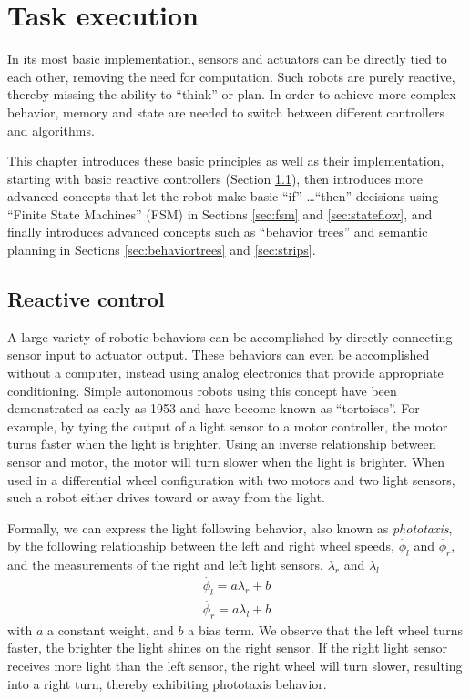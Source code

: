 \chapter{Task execution}\label{chap:taskexecution}
In its most basic implementation, sensors and actuators can be directly tied to each other, removing the need for computation. Such robots are purely reactive, thereby missing the ability to ``think'' or plan. In order to achieve more complex behavior, memory and state are needed to switch between different controllers and algorithms.

This chapter introduces these basic principles as well as their implementation, starting with basic reactive controllers (Section \ref{sec:braitenberg}), then introduces more advanced concepts that let the robot make basic ``if'' \ldots ``then'' decisions using ``Finite State Machines'' (FSM) in Sections \ref{sec:fsm} and \ref{sec:stateflow}, and finally introduces advanced concepts such as ``behavior trees'' and semantic planning in Sections \ref{sec:behaviortrees} and \ref{sec:strips}.

\section{Reactive control}\label{sec:braitenberg}
A large variety of robotic behaviors can be accomplished by directly connecting sensor input to actuator output. These behaviors can even be accomplished without a computer, instead using analog electronics that provide appropriate conditioning. Simple autonomous robots using this concept have been demonstrated as early as 1953 \cite{walter1953living} and have become known as ``tortoises''. For example, by tying the output of a light sensor to a motor controller, the motor turns faster when the light is brighter. Using an inverse relationship between sensor and motor, the motor will turn slower when the light is brighter. When used in a differential wheel configuration with two motors and two light sensors, such a robot either drives toward or away from the light. 

Formally, we can express the light following behavior, also known as \emph{phototaxis}, by the following relationship between
the left and right wheel speeds, $\dot{\phi_l}$ and $\dot{\phi_r}$, and the measurements of the right and left light sensors, $\lambda_r$ and $\lambda_l$
\begin{eqnarray}\label{eq:simplereactive}
\dot{\phi_l}=a \lambda_r + b\\
\dot{\phi_r}=a \lambda_l + b
\end{eqnarray}
with $a$ a constant weight, and $b$ a bias term. We observe that the left wheel turns faster, the brighter the light shines on the right sensor. If the right light sensor receives more light than the left sensor, the right wheel will turn slower, resulting into a right turn, thereby exhibiting phototaxis behavior.

